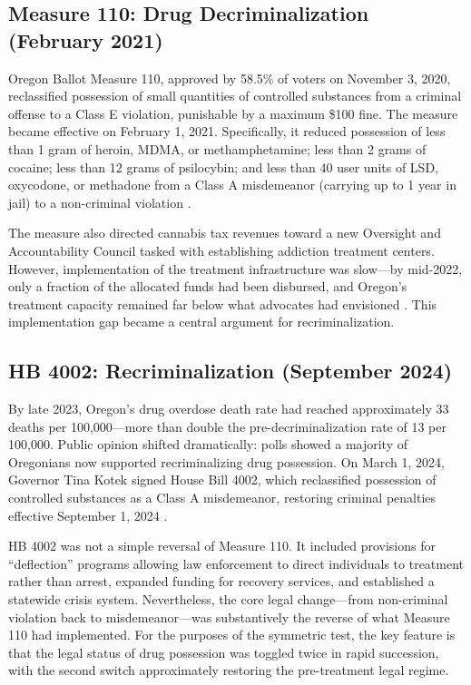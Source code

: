 \documentclass[12pt]{article}
\begin{document}
\subsection{Measure 110: Drug Decriminalization (February 2021)}

Oregon Ballot Measure 110, approved by 58.5\% of voters on November 3, 2020, reclassified possession of small quantities of controlled substances from a criminal offense to a Class E violation, punishable by a maximum \$100 fine. The measure became effective on February 1, 2021. Specifically, it reduced possession of less than 1 gram of heroin, MDMA, or methamphetamine; less than 2 grams of cocaine; less than 12 grams of psilocybin; and less than 40 user units of LSD, oxycodone, or methadone from a Class A misdemeanor (carrying up to 1 year in jail) to a non-criminal violation \citep{measure110ballot}.

The measure also directed cannabis tax revenues toward a new Oversight and Accountability Council tasked with establishing addiction treatment centers. However, implementation of the treatment infrastructure was slow---by mid-2022, only a fraction of the allocated funds had been disbursed, and Oregon's treatment capacity remained far below what advocates had envisioned \citep{morgan2023measure110}. This implementation gap became a central argument for recriminalization.

\subsection{HB 4002: Recriminalization (September 2024)}

By late 2023, Oregon's drug overdose death rate had reached approximately 33 deaths per 100,000---more than double the pre-decriminalization rate of 13 per 100,000. Public opinion shifted dramatically: polls showed a majority of Oregonians now supported recriminalizing drug possession. On March 1, 2024, Governor Tina Kotek signed House Bill 4002, which reclassified possession of controlled substances as a Class A misdemeanor, restoring criminal penalties effective September 1, 2024 \citep{hb4002bill}.

HB 4002 was not a simple reversal of Measure 110. It included provisions for ``deflection'' programs allowing law enforcement to direct individuals to treatment rather than arrest, expanded funding for recovery services, and established a statewide crisis system. Nevertheless, the core legal change---from non-criminal violation back to misdemeanor---was substantively the reverse of what Measure 110 had implemented. For the purposes of the symmetric test, the key feature is that the legal status of drug possession was toggled twice in rapid succession, with the second switch approximately restoring the pre-treatment legal regime.
\end{document}
